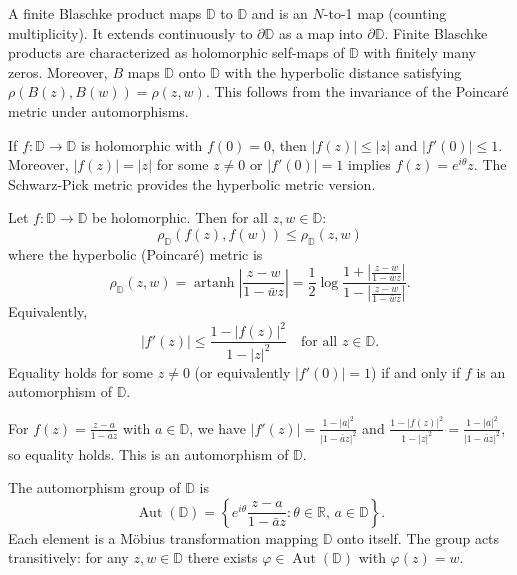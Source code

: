 \begin{example}
A finite Blaschke product maps $\mathbb{D}$ to $\mathbb{D}$ and is an $N$-to-1 map (counting multiplicity). It extends continuously to $\partial \mathbb{D}$ as a map into $\partial \mathbb{D}$. Finite Blaschke products are characterized as holomorphic self-maps of $\mathbb{D}$ with finitely many zeros. Moreover, $B$ maps $\mathbb{D}$ onto $\mathbb{D}$ with the hyperbolic distance satisfying $\rho(B(z), B(w)) = \rho(z, w)$. This follows from the invariance of the Poincaré metric under automorphisms.
\end{example}

\begin{example}
If $f: \mathbb{D} \to \mathbb{D}$ is holomorphic with $f(0) = 0$, then $|f(z)| \leq |z|$ and $|f'(0)| \leq 1$. Moreover, $|f(z)| = |z|$ for some $z \neq 0$ or $|f'(0)| = 1$ implies $f(z) = e^{i\theta}z$. The Schwarz-Pick metric provides the hyperbolic metric version.
\end{example}

\begin{theorem}
Let $f: \mathbb{D} \to \mathbb{D}$ be holomorphic. Then for all $z, w \in \mathbb{D}$:
\[
\rho_{\mathbb{D}}(f(z), f(w)) \leq \rho_{\mathbb{D}}(z, w)
\]
where the hyperbolic (Poincar\'e) metric is
\[
\rho_{\mathbb{D}}(z, w) = \operatorname{artanh}\left|\frac{z-w}{1-\bar{w}z}\right| = \frac{1}{2} \log \frac{1 + \left|\frac{z-w}{1-\bar{w}z}\right|}{1 - \left|\frac{z-w}{1-\bar{w}z}\right|}.
\]
Equivalently,
\[
\left|f'(z)\right| \leq \frac{1 - |f(z)|^2}{1 - |z|^2} \quad \text{for all } z \in \mathbb{D}.
\]
Equality holds for some $z \neq 0$ (or equivalently $|f'(0)| = 1$) if and only if $f$ is an automorphism of $\mathbb{D}$.
\end{theorem}

\begin{example}
For $f(z) = \frac{z-a}{1-\bar{a}z}$ with $a \in \mathbb{D}$, we have $|f'(z)| = \frac{1-|a|^2}{|1-\bar{a}z|^2}$ and $\frac{1-|f(z)|^2}{1-|z|^2} = \frac{1-|a|^2}{|1-\bar{a}z|^2}$, so equality holds. This is an automorphism of $\mathbb{D}$.
\end{example}

\begin{example}
The automorphism group of $\mathbb{D}$ is
\[
\operatorname{Aut}(\mathbb{D}) = \left\{ e^{i\theta} \frac{z - a}{1 - \bar{a}z} : \theta \in \mathbb{R}, \, a \in \mathbb{D} \right\}.
\]
Each element is a M\"obius transformation mapping $\mathbb{D}$ onto itself. The group acts transitively: for any $z, w \in \mathbb{D}$ there exists $\varphi \in \operatorname{Aut}(\mathbb{D})$ with $\varphi(z) = w$.
\end{example}

